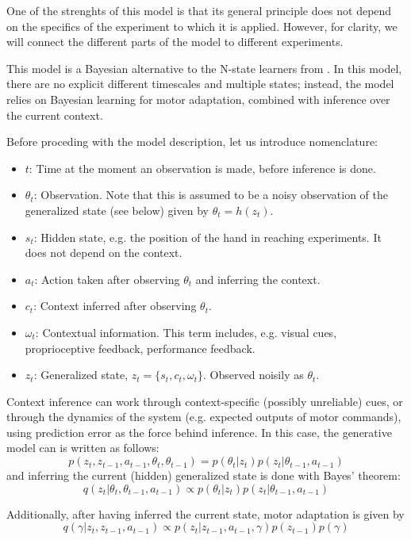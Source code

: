 \documentclass[a4paper,doc,floatsintext,natbib]{apa6}
\begin{document}
One of the strenghts of this model is that its general principle does not
depend on the specifics of the experiment to which it is applied. However, for
clarity, we will connect the different parts of the model to different
experiments.

This model is a Bayesian alternative to the N-state learners from
\citep[e.g.][]{Lee_Dual_2009}. In this model, there are no explicit different
timescales and multiple states; instead, the model relies on Bayesian learning
for motor adaptation, combined with inference over the current context.

Before proceding with the model description, let us introduce nomenclature:
\begin{itemize}
\item $t$: Time at the moment an observation is made, before inference is done.
\item $\theta_t$: Observation. Note that this is assumed to be a noisy
observation of the generalized state (see below) given by $\theta_t = h(z_t)$.
\item $s_t$: Hidden state, e.g. the position of the hand in reaching
experiments. It does not depend on the context.
\item $a_t$: Action taken after observing $\theta_t$ and inferring the context.
\item $c_t$: Context inferred after observing $\theta_t$.
\item $\omega_t$: Contextual information. This term includes, e.g. visual cues,
proprioceptive feedback, performance feedback.
\item $z_t$: Generalized state, $z_t = \{s_t, c_t, \omega_t\}$. Observed noisily
as $\theta_t$.
\end{itemize}

Context inference can work through context-specific (possibly unreliable) cues,
or through the dynamics of the system (e.g. expected outputs of motor
commands), using prediction error as the force behind inference. In this case,
the generative model can is written as follows:
\[
p(z_t, z_{t-1}, a_{t-1}, \theta_t, \theta_{t-1}) = p(\theta_t | z_t)p(z_t|\theta_{t-1}, a_{t-1})
\]
and inferring the current (hidden) generalized state is done with Bayes' theorem:
\[
  q(z_t | \theta_t, \theta_{t-1}, a_{t-1}) \propto p(\theta_t | z_t)p(z_t|\theta_{t-1}, a_{t-1})
\]
  
Additionally, after having inferred the current state, motor adaptation is given by
\[
q(\gamma | z_t, z_{t-1}, a_{t-1}) \propto p(z_t | z_{t-1}, a_{t-1}, \gamma)p(z_{t-1})p(\gamma)
\]
\end{document}
